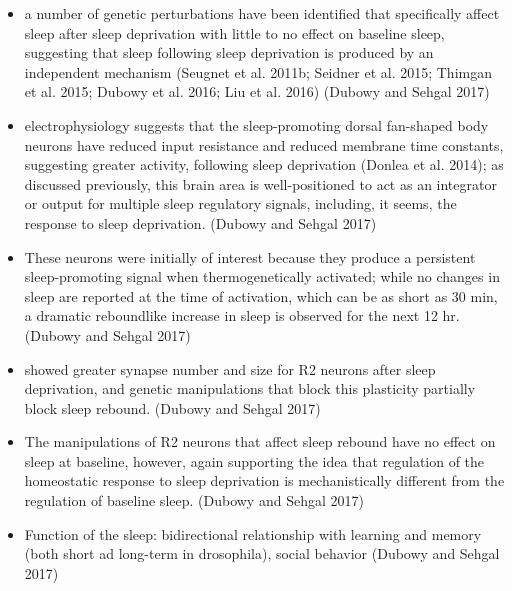 \documentclass[11pt]{article}
\begin{document}
\begin{itemize}
    \item a number of genetic perturbations have been identified that specifically affect sleep
    after sleep deprivation with little to no effect on baseline sleep, suggesting that sleep 
    following sleep deprivation is produced by an independent mechanism (Seugnet et al. 2011b;
    Seidner et al. 2015; Thimgan et al. 2015; Dubowy et al. 2016; Liu et al. 2016)
    \cite{dubowyCircadianRhythmsSleep2017} (Dubowy and Sehgal 2017)

    \item electrophysiology suggests that the sleep-promoting dorsal fan-shaped body neurons have
    reduced input resistance and reduced membrane time constants, suggesting greater activity, 
    following sleep deprivation (Donlea et al. 2014); as discussed previously, this brain area 
    is well-positioned to act as an integrator or output for multiple sleep regulatory signals, 
    including, it seems, the response to sleep deprivation.
    \cite{dubowyCircadianRhythmsSleep2017} (Dubowy and Sehgal 2017)

    \item These neurons were initially of interest because they produce a persistent sleep-promoting 
    signal when thermogenetically activated; while no changes in sleep are reported at the time of 
    activation, which can be as short as 30 min, a dramatic reboundlike increase in sleep is observed
    for the next 12 hr.
    \cite{dubowyCircadianRhythmsSleep2017} (Dubowy and Sehgal 2017)

    \item showed greater synapse number and size for R2 neurons after sleep deprivation, and 
    genetic manipulations that block this plasticity partially block sleep rebound.
    \cite{dubowyCircadianRhythmsSleep2017} (Dubowy and Sehgal 2017)

    \item The manipulations of R2 neurons that affect sleep rebound have no effect on sleep at 
    baseline, however, again supporting the idea that regulation of the
    homeostatic response to sleep deprivation is mechanistically different from the regulation
    of baseline sleep.
    \cite{dubowyCircadianRhythmsSleep2017} (Dubowy and Sehgal 2017)

    \item Function of the sleep: bidirectional relationship with learning and memory 
    (both short ad long-term in drosophila),
    social behavior
    \cite{dubowyCircadianRhythmsSleep2017} (Dubowy and Sehgal 2017)


\end{itemize}
\end{document}
